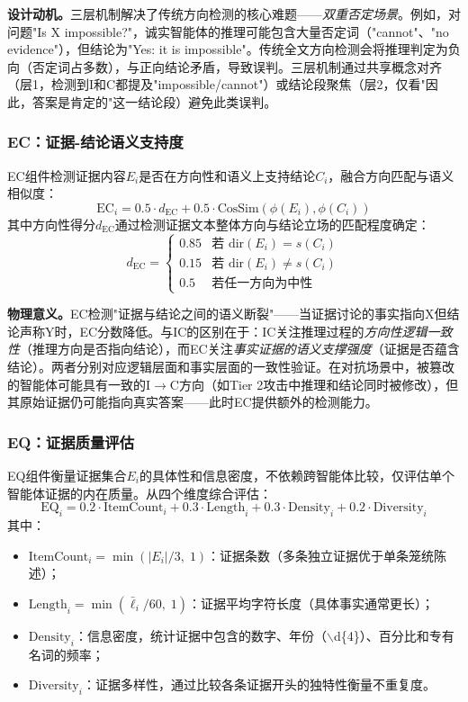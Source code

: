 \documentclass[12pt,a4paper,UTF8,fontset=fandol]{ctexart}
\begin{document}
\textbf{设计动机。}三层机制解决了传统方向检测的核心难题——\textit{双重否定场景}。例如，对问题"Is X impossible?"，诚实智能体的推理可能包含大量否定词（"cannot"、"no evidence"），但结论为"Yes: it is impossible"。传统全文方向检测会将推理判定为负向（否定词占多数），与正向结论矛盾，导致误判。三层机制通过共享概念对齐（层1，检测到I和C都提及"impossible/cannot"）或结论段聚焦（层2，仅看"因此，答案是肯定的"这一结论段）避免此类误判。

\subsubsection{EC：证据-结论语义支持度}

EC组件检测证据内容$E_i$是否在方向性和语义上支持结论$C_i$，融合方向匹配与语义相似度：
\begin{equation}\label{eq:ec}
\text{EC}_i = 0.5 \cdot d_{\text{EC}} + 0.5 \cdot \text{CosSim}(\phi(E_i), \phi(C_i))
\end{equation}
其中方向性得分$d_{\text{EC}}$通过检测证据文本整体方向与结论立场的匹配程度确定：
\begin{equation}
d_{\text{EC}} = \begin{cases}
0.85 & \text{若 } \text{dir}(E_i) = s(C_i) \\
0.15 & \text{若 } \text{dir}(E_i) \neq s(C_i) \\
0.5 & \text{若任一方向为中性}
\end{cases}
\end{equation}

\textbf{物理意义。}EC检测"证据与结论之间的语义断裂"——当证据讨论的事实指向X但结论声称Y时，EC分数降低。与IC的区别在于：IC关注推理过程的\textit{方向性逻辑一致性}（推理方向是否指向结论），而EC关注\textit{事实证据的语义支撑强度}（证据是否蕴含结论）。两者分别对应逻辑层面和事实层面的一致性验证。在对抗场景中，被篡改的智能体可能具有一致的I$\to$C方向（如Tier 2攻击中推理和结论同时被修改），但其原始证据仍可能指向真实答案——此时EC提供额外的检测能力。

\subsubsection{EQ：证据质量评估}

EQ组件衡量证据集合$E_i$的具体性和信息密度，不依赖跨智能体比较，仅评估单个智能体证据的内在质量。从四个维度综合评估：
\begin{equation}\label{eq:eq}
\text{EQ}_i = 0.2 \cdot \text{ItemCount}_i + 0.3 \cdot \text{Length}_i + 0.3 \cdot \text{Density}_i + 0.2 \cdot \text{Diversity}_i
\end{equation}
其中：
\begin{itemize}[nosep]
    \item $\text{ItemCount}_i = \min(|E_i| / 3,\; 1)$：证据条数（多条独立证据优于单条笼统陈述）；
    \item $\text{Length}_i = \min(\bar{\ell}_i / 60,\; 1)$：证据平均字符长度（具体事实通常更长）；
    \item $\text{Density}_i$：信息密度，统计证据中包含的数字、年份（$\backslash$d\{4\}）、百分比和专有名词的频率；
    \item $\text{Diversity}_i$：证据多样性，通过比较各条证据开头的独特性衡量不重复度。
\end{itemize}
\end{document}
